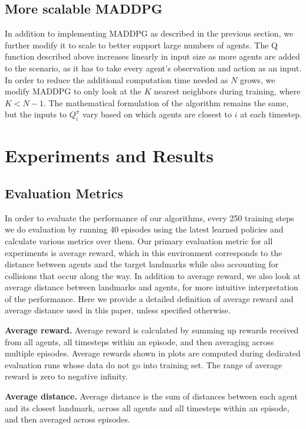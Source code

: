 \documentclass{article}
\begin{document}
\subsection{More scalable MADDPG}
In addition to implementing MADDPG as described in the previous section, we further modify it to scale to better support large numbers of agents. The Q function described above increases linearly in input size as more agents are added to the scenario, as it has to take every agent's observation and action as an input. In order to reduce the additional computation time needed as $N$ grows, we modify MADDPG to only look at the $K$ nearest neighbors during training, where $K < N-1$. The mathematical formulation of the algorithm remains the same, but the inputs to $Q^\pi_i$ vary based on which agents are closest to $i$ at each timestep.

\section{Experiments and Results}
\subsection{Evaluation Metrics}

In order to evaluate the performance of our algorithms, every 250 training steps we do evaluation by running 40 episodes using the latest learned policies and calculate various metrics over them. Our primary evaluation metric for all experiments is average reward, which in this environment corresponds to the distance between agents and the target landmarks while also accounting for collisions that occur along the way. In addition to average reward, we also look at average distance between landmarks and agents, for more intuitive interpretation of the performance. Here we provide a detailed definition of average reward and average distance used in this paper, unless specified otherwise.

\textbf{Average reward.} Average reward is calculated by summing up rewards received from all agents, all timesteps within an episode, and then averaging across multiple episodes. Average rewards shown in plots are computed during dedicated evaluation runs whose data do not go into training set. The range of average reward is zero to negative infinity. 

\textbf{Average distance.} Average distance is the sum of distances between each agent and its closest landmark, across all agents and all timesteps within an episode, and then averaged across episodes.
\end{document}
